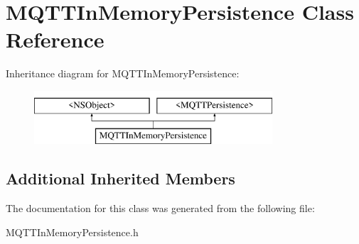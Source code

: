 \hypertarget{interface_m_q_t_t_in_memory_persistence}{}\section{M\+Q\+T\+T\+In\+Memory\+Persistence Class Reference}
\label{interface_m_q_t_t_in_memory_persistence}
Inheritance diagram for M\+Q\+T\+T\+In\+Memory\+Persistence\+:\begin{figure}[H]
\begin{center}
\leavevmode
\includegraphics[height=2.000000cm]{interface_m_q_t_t_in_memory_persistence}
\end{center}
\end{figure}
\subsection*{Additional Inherited Members}


The documentation for this class was generated from the following file\+:\begin{DoxyCompactItemize}
\item 
M\+Q\+T\+T\+In\+Memory\+Persistence.\+h\end{DoxyCompactItemize}
